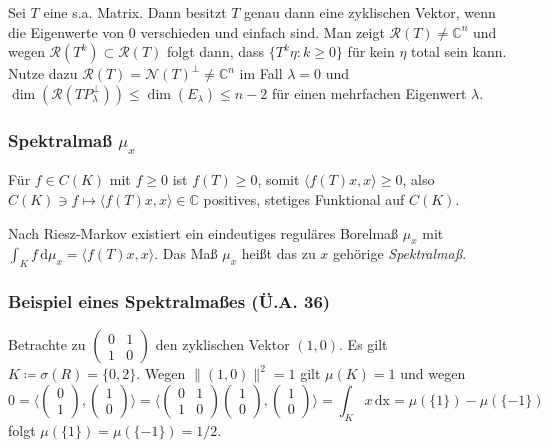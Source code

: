 \documentclass[11pt,a4paper]{scrartcl}
\newcommand{\C}{\mathbb{C}} %
\newcommand{\Nc}{\mathcal{N}}
\newcommand{\Rc}{\mathcal{R}}
\theoremstyle{plain}
\theoremstyle{definition}
\theoremstyle{remark}
\begin{document}
Sei $T$ eine s.a. Matrix. Dann besitzt $T$ genau dann eine zyklischen Vektor, wenn die Eigenwerte von $0$ verschieden und einfach sind. Man zeigt $\Rc(T)\neq \C^n$ und wegen $\Rc(T^k) \subset \Rc(T)$ folgt dann, dass $\{T^k\eta: k\geq 0\}$ für kein $\eta$ total sein kann. Nutze dazu $\Rc(T)=\Nc(T)^\bot\neq \C^n$ im Fall $\lambda = 0$ und $\dim(\Rc(TP_\lambda^\bot))\leq \dim(E_\lambda) \leq n-2$ für einen mehrfachen Eigenwert $\lambda$.

\subsubsection{Spektralmaß $\mu_x$}

Für $f\in C(K)$ mit $f \geq 0$ ist $f(T) \geq 0$, somit $\langle f(T)x, x \rangle \geq 0$, also $C(K)\ni f \mapsto \langle f(T)x,x \rangle \in \C$ positives, stetiges Funktional auf $C(K)$.

Nach Riesz-Markov existiert ein eindeutiges reguläres Borelmaß $\mu_x$ mit $\int_K f \,\mathrm{d}\mu_x = \langle f(T)x, x \rangle$. Das Maß $\mu_x$ heißt das zu $x$ gehörige \emph{Spektralmaß}.


\subsubsection{Beispiel eines Spektralmaßes (Ü.A. 36)}

Betrachte zu $\left(\begin{smallmatrix} 0 & 1 \\ 1 & 0 \end{smallmatrix}\right)$ den zyklischen Vektor $(1,0)$. Es gilt $K\coloneqq \sigma(R)=\{0, 2\}$. Wegen $\|(1,0)\|^2=1$ gilt $\mu(K)=1$ und wegen $$0=\langle \left(\begin{smallmatrix} 0 \\ 1 \end{smallmatrix}\right), \left(\begin{smallmatrix} 1 \\ 0 \end{smallmatrix}\right) \rangle=\langle \left(\begin{smallmatrix} 0 & 1 \\ 1 & 0 \end{smallmatrix}\right)\left(\begin{smallmatrix} 1 \\ 0 \end{smallmatrix}\right), \left(\begin{smallmatrix} 1 \\ 0 \end{smallmatrix}\right) \rangle=\int_K x \, \mathrm{dx}=\mu(\{1\})-\mu(\{-1\})$$ folgt $\mu(\{1\})=\mu(\{-1\})=1/2$.
\end{document}
